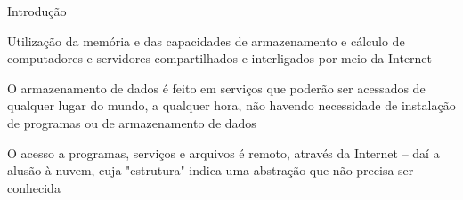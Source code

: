 \begin{frame}{Introdução}
    \begin{itemise}
    \item<1-> Utilização da memória e das capacidades de armazenamento e cálculo
         de computadores e servidores compartilhados e interligados por meio da
        Internet
    \item<2-> O armazenamento de dados é feito em serviços que poderão ser acessados
        de qualquer lugar do mundo, a qualquer hora, não havendo necessidade de
        instalação de programas ou de armazenamento de dados
    \item<3-> O acesso a programas, serviços e arquivos é remoto, através da Internet
        -- daí a alusão à nuvem, cuja "estrutura" indica uma abstração que não precisa
        ser conhecida
    \end{itemise}

\end{frame}




